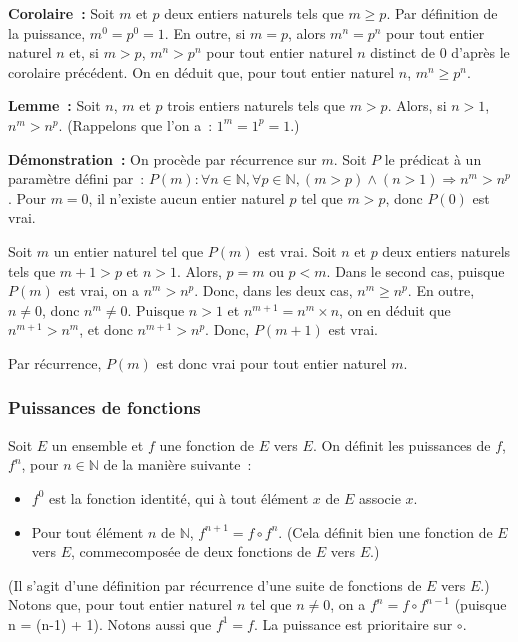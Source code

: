 \medskip

\noindent\textbf{Corolaire :} 
    Soit $m$ et $p$ deux entiers naturels tels que $m \geq p$.
    Par définition de la puissance, $m^0 = p^0 = 1$.
    En outre, si $m = p$, alors $m^n = p^n$ pour tout entier naturel $n$ et, si $m > p$, $m^n > p^n$ pour tout entier naturel $n$ distinct de $0$ d'après le corolaire précédent.
    On en déduit que, pour tout entier naturel $n$, $m^n \geq p^n$.

\medskip

\noindent\textbf{Lemme :} Soit $n$, $m$ et $p$ trois entiers naturels tels que $m > p$. 
    Alors, si $n > 1$, $n^m > n^p$. 
    (Rappelons que l'on a : $1^m = 1^p = 1$.)

\medskip

\noindent\textbf{Démonstration :} On procède par récurrence sur $m$. 
    Soit $P$ le prédicat à un paramètre défini par : $P(m): \forall n \in \mathbb{N}, \forall p \in \mathbb{N}, (m > p) \wedge (n > 1) \Rightarrow n^m > n^p$. 
    Pour $m=0$, il n'existe aucun entier naturel $p$ tel que $m > p$, donc $P(0)$ est vrai. 

    Soit $m$ un entier naturel tel que $P(m)$ est vrai. 
    Soit $n$ et $p$ deux entiers naturels tels que $m+1 > p$ et $n > 1$. 
    Alors, $p = m$ ou $p < m$. 
    Dans le second cas, puisque $P(m)$ est vrai, on a $n^m > n^p$. 
    Donc, dans les deux cas, $n^m \geq n^p$. 
    En outre, $n \neq 0$, donc $n^m \neq 0$.
    Puisque $n > 1$ et $n^{m+1} = n^m \times n$, on en déduit que $n^{m+1} > n^m$, et donc $n^{m+1} > n^p$. 
    Donc, $P(m+1)$ est vrai. 

    Par récurrence, $P(m)$ est donc vrai pour tout entier naturel $m$.

   \done 


\subsubsection{Puissances de fonctions}

Soit $E$ un ensemble et $f$ une fonction de $E$ vers $E$. 
On définit les puissances de $f$, $f^n$, pour $n \in \mathbb{N}$ de la manière suivante :
\begin{itemize}[nosep]
    \item $f^0$ est la fonction identité, qui à tout élément $x$ de $E$ associe $x$. 
    \item Pour tout élément $n$ de $\mathbb{N}$, $f^{n+1} = f \circ f^n$. 
        (Cela définit bien une fonction de $E$ vers $E$, commecomposée de deux fonctions de $E$ vers $E$.)
\end{itemize}
(Il s'agit d'une définition par récurrence d'une suite de fonctions de $E$ vers $E$.) 
Notons que, pour tout entier naturel $n$ tel que $n \neq 0$, on a $f^{n} = f \circ f^{n-1}$ (puisque n = (n-1) + 1).
Notons aussi que $f^1 = f$. 
La puissance est prioritaire sur $\circ$.

